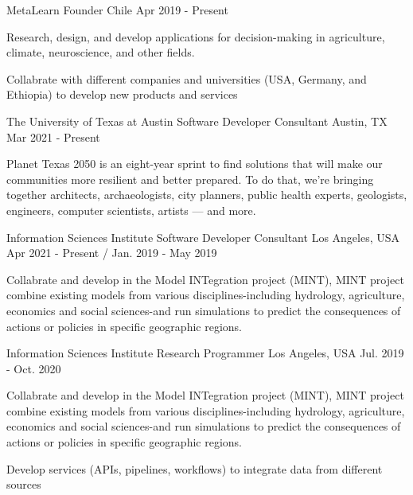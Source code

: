 \begin{cventries}

  \cventry
    {MetaLearn}
    {Founder}
    {Chile}
    {Apr 2019 - Present}
    {
      \begin{cvitems}
        \item{Research, design, and develop applications for decision-making in agriculture, climate, neuroscience, and other fields.}
        \item{Collabrate with different companies and universities (USA, Germany, and Ethiopia) to develop new products and services}
      \end{cvitems}
    }

  \cventry
    {The University of Texas at Austin}
    {Software Developer Consultant}
    {Austin, TX}
    {Mar 2021 - Present}
    {
      \begin{cvitems}
        \item{Planet Texas 2050 is an eight-year sprint to find solutions that will make our communities more resilient and better prepared. To do that, we’re bringing together architects, archaeologists, city planners, public health experts, geologists, engineers, computer scientists, artists — and more.}
      \end{cvitems}
    }

  \cventry
    {Information Sciences Institute}
    {Software Developer Consultant}
    {Los Angeles, USA}
    {Apr 2021 - Present / Jan. 2019 - May 2019}
    {
      \begin{cvitems}
        \item{Collabrate and develop in the Model INTegration project (MINT), MINT project combine existing models from various disciplines-including hydrology, agriculture, economics and social sciences-and run simulations to predict the consequences of actions or policies in specific geographic regions.}
      \end{cvitems}
    }

  \cventry
    {Information Sciences Institute}
    {Research Programmer}
    {Los Angeles, USA}
    {Jul. 2019 - Oct. 2020}
    {
      \begin{cvitems}
        \item{Collabrate and develop in the Model INTegration project (MINT), MINT project combine existing models from various disciplines-including hydrology, agriculture, economics and social sciences-and run simulations to predict the consequences of actions or policies in specific geographic regions.}
        \item {Develop services (APIs, pipelines, workflows) to integrate data from different sources}
      \end{cvitems}
    }
    

\end{cventries}
